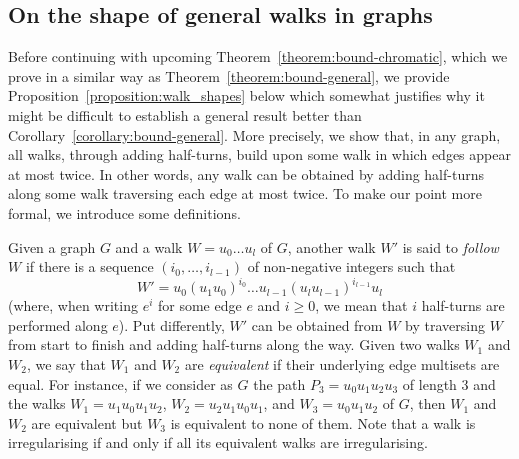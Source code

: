 \documentclass[a4paper,11pt,dvipsnames]{elsarticle}
\newcommand{\sam}[1]{\todo[size=\tiny,color=red!20!white]{\textbf{Sam:} #1}}
\newcommand{\sam}[1]{}
\begin{document}



\subsection{On the shape of general walks in graphs}

Before continuing with upcoming Theorem~\ref{theorem:bound-chromatic}, which we prove in a similar way as Theorem~\ref{theorem:bound-general}, we provide Proposition~\ref{proposition:walk_shapes} below which somewhat justifies why it might be difficult to establish a general result better than Corollary~\ref{corollary:bound-general}.
More precisely, we show that, in any graph, all walks, through adding half-turns, build upon some walk in which edges appear at most twice. In other words, any walk can be obtained by adding half-turns along some walk traversing each edge at most twice.
To make our point more formal, we introduce some definitions.

Given a graph $G$ and a walk $W=u_0\dots u_l$ of $G$, another
walk $W'$ is said to \emph{follow} $W$ if there is a sequence $(i_0,\dots,i_{l-1})$ of non-negative integers such that $$W'=u_0(u_1u_0)^{i_0}\dots u_{l-1}(u_lu_{l-1})^{i_{l-1}}u_l$$ (where, when writing $e^i$ for some edge $e$ and $i \geq 0$, we mean that $i$ half-turns are performed along $e$).
Put differently, $W'$ can be obtained from $W$ by traversing $W$ from start to finish and adding half-turns along the way. Given two walks $W_1$ and $W_2$,
we say that $W_1$ and $W_2$ are \emph{equivalent} if their underlying edge multisets are equal. For instance, if we consider as $G$ the path $P_3=u_0u_1u_2u_3$ of length
$3$ and the walks $W_1=u_1u_0u_1u_2$, $W_2=u_2u_1u_0u_1$, and $W_3=u_0u_1u_2$
of $G$, then $W_1$ and $W_2$ are equivalent
but $W_3$ is equivalent to none of them. Note that a walk is irregularising if and only if all its equivalent walks are irregularising.
\end{document}
